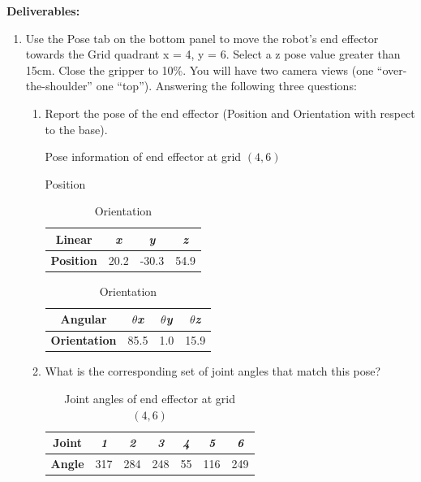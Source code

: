 \documentclass[12pt]{article}
\begin{document}
\textbf{Deliverables:}
\begin{enumerate}
    \item Use the Pose tab on the bottom panel to move the robot’s end effector towards the Grid quadrant x = 4, y = 6. Select a z pose value greater than 15cm. Close the gripper to 10\%. You will have two camera views (one “over-the-shoulder” one “top”). Answering the following three questions:
    \begin{enumerate}
    \item Report the pose of the end effector (Position and Orientation with respect to the base).
    
    \begin{table}[H]
        \caption{Pose information of end effector at grid $(4, 6)$}
        \begin{subtable}{.5\linewidth}
            \centering
            \caption{Position}
            \begin{tabular}{cccc}
                \toprule
                \textbf{Linear} & \textit{x} & \textit{y} & \textit{z} \\\midrule
                \textbf{Position} & 20.2 & -30.3 & 54.9 \\\bottomrule
            \end{tabular}
        \end{subtable}
        \begin{subtable}{.5\linewidth}
            \centering
            \caption{Orientation}
            \begin{tabular}{cccc}
                \toprule
                \textbf{Angular} & \textit{$\theta$x} & \textit{$\theta$y} & \textit{$\theta$z} \\\midrule
                \textbf{Orientation} & 85.5 & 1.0 & 15.9 \\\bottomrule
            \end{tabular}
        \end{subtable}
    \end{table}

    \item What is the corresponding set of joint angles that match this pose?
    
    \begin{table}[H]
        \centering
        \caption{Joint angles of end effector at grid $(4, 6)$}
        \begin{tabular}{ccccccc}
        \toprule
        \textbf{Joint} & \textit{1} & \textit{2} & \textit{3} & \textit{4} & \textit{5} & \textit{6} \\ \midrule
        \textbf{Angle} & 317        & 284        & 248        & 55         & 116        & 249        \\ \bottomrule
        \end{tabular}
    \end{table}


\end{enumerate}
\end{enumerate}
\end{document}

